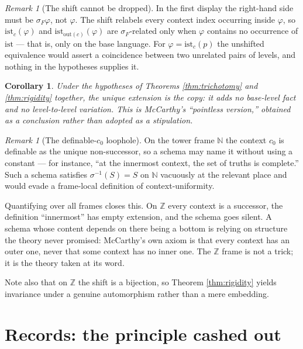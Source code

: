 \documentclass[11pt]{article}
\theoremstyle{plain}
\newtheorem{corollary}[theorem]{Corollary}
\theoremstyle{definition}
\theoremstyle{remark}
\newtheorem{remark}[theorem]{Remark}
\newcommand{\ist}{\mathrm{ist}}
\newcommand{\out}{\mathrm{out}}
\begin{document}
\begin{remark}[The shift cannot be dropped]
In the first display the right-hand side must be $\sigma_F\varphi$, not
$\varphi$. The shift relabels every context index occurring inside $\varphi$, so
$\ist_c(\varphi)$ and $\ist_{\out(c)}(\varphi)$ are $\sigma_F$-related only when
$\varphi$ contains no occurrence of $\ist$ --- that is, only on the base
language. For $\varphi = \ist_{c}(p)$ the unshifted equivalence would assert a
coincidence between two unrelated pairs of levels, and nothing in the hypotheses
supplies it.
\end{remark}

\begin{corollary}
Under the hypotheses of Theorems \ref{thm:trichotomy} and \ref{thm:rigidity}
together, the unique extension is the copy: it adds no base-level fact and no
level-to-level variation. This is McCarthy's ``pointless version,'' obtained as
a conclusion rather than adopted as a stipulation.
\end{corollary}

\begin{remark}[The definable-$c_0$ loophole]\label{rem:definable}
On the tower frame $\mathbb{N}$ the context $c_0$ is definable as the unique
non-successor, so a schema may name it without using a constant --- for
instance, ``at the innermost context, the set of truths is complete.'' Such a
schema satisfies $\sigma^{-1}(S)=S$ on $\mathbb{N}$ vacuously at the relevant
place and would evade a frame-local definition of context-uniformity.

Quantifying over all frames closes this. On $\mathbb{Z}$ every context is a
successor, the definition ``innermost'' has empty extension, and the schema goes
silent. A schema whose content depends on there being a bottom is relying on
structure the theory never promised: McCarthy's own axiom is that every context
has an outer one, never that some context has no inner one. The $\mathbb{Z}$
frame is not a trick; it is the theory taken at its word.

Note also that on $\mathbb{Z}$ the shift is a bijection, so
Theorem \ref{thm:rigidity} yields invariance under a genuine automorphism rather
than a mere embedding.
\end{remark}

\section{Records: the principle cashed out}\label{sec:records}
\end{document}
